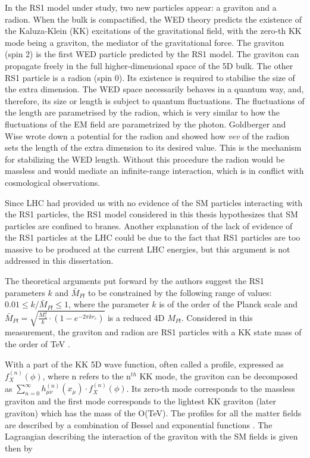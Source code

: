 In the RS1 model under study, two new particles appear: a graviton and a radion. When the bulk is compactified, the WED theory predicts the existence of the Kaluza-Klein (KK) \cite{Uzawa:1999pg} excitations of the gravitational field, with the zero-th KK mode being a graviton, the mediator of the gravitational force. The graviton (spin 2) is the first WED particle predicted by the RS1 model. The graviton can propagate freely in the full higher-dimensional space of the 5D bulk. The other RS1 particle is a radion (spin 0). Its existence is required to stabilise the size of the extra dimension. The WED space necessarily behaves in a quantum way, and, therefore, its size or length is subject to quantum fluctuations. The fluctuations of the length are parametrised by the radion, which is very similar to how the fluctuations of the EM field are parametrized by the photon. Goldberger and Wise \cite{Goldberger:1999uk} wrote down a potential for the radion and showed how \textit{vev} of the radion sets the length of the extra dimension to its desired value. This is the mechanism for stabilizing the WED length. Without this procedure the radion would be massless and would mediate an infinite-range interaction, which is in conflict with cosmological observations. 


Since LHC had provided us with no evidence of the SM particles interacting with the RS1 particles, the RS1 model considered in this thesis hypothesizes that SM particles are confined to branes. Another explanation of the lack of evidence of the RS1 particles at the LHC could be due to the fact that RS1 particles are too massive to be produced at the current LHC energies, but this argument is not addressed in this dissertation. 


The theoretical arguments put forward by the authors \cite{Davoudiasl:1999jd} suggest the RS1 parameters $k$ and $\bar{M}_{Pl}$ to be constrained by the following range of values: $0.01 \leq k / \bar{M}_{Pl} \leq 1$, where the parameter $k$ is of the order of the Planck scale and $\bar{M}_{Pl} = \sqrt{\frac{M^3_5}{k} \cdot (1 - e^{-2\pi k r_c} ) }$ is a reduced 4D $M_{Pl}$. Considered in this measurement, the graviton and radion are RS1 particles with a KK state mass of the order of TeV \cite{Oliveira:2014kla}. 

With a part of the KK 5D wave function, often called a profile, expressed as $f^{(n)}_X(\phi)$, where n refers to the n$^{th}$ KK mode, the graviton can be decomposed as $\sum_{n=0}^{\infty} h^{(n)}_{\mu\nu}(x_\mu) \cdot f^{(n)}_X(\phi)$. Its zero-th mode corresponds to the massless graviton and the first mode corresponds to the lightest KK graviton (later graviton) which has the mass of the O(TeV). The profiles for all the matter fields are described by a combination of Bessel and exponential functions \cite{Traczyk:2002jh, Goldberger:1999wh,Raychaudhuri:2126967}. The Lagrangian describing the interaction of the graviton with the SM fields is given then by 

